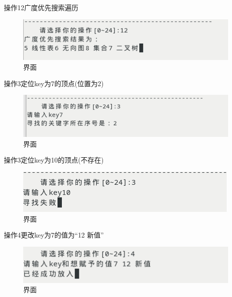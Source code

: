 \documentclass[supercite]{Experimental_Report}
\theoremstyle{definition}
\begin{document}
操作12广度优先搜索遍历

\begin{figure}[!htb]
	\begin{center}
		\includegraphics[scale=0.60]{images/2-11.png}
		\caption{界面}
		\label{fig2-8}
		\end{center}
\end{figure}

操作3定位key为7的顶点(位置为2)

\begin{figure}[!htb]
	\begin{center}
		\includegraphics[scale=0.60]{images/2-7.png}
		\caption{界面}
		\label{fig2-9}
		\end{center}
\end{figure}

操作3定位key为10的顶点(不存在)

\begin{figure}[!htb]
	\begin{center}
		\includegraphics[scale=0.60]{images/2-8.png}
		\caption{界面}
		\label{fig2-10}
		\end{center}
\end{figure}

操作4更改key为7的值为“12 新值”

\begin{figure}[!htb]
	\begin{center}
		\includegraphics[scale=0.60]{images/2-9.png}
		\caption{界面}
		\label{fig2-11}
		\end{center}
\end{figure}
\end{document}

